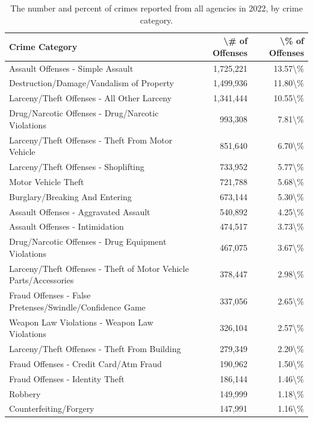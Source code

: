 \documentclass[
  12pt,
  openany]{book}
\begin{document}
\begin{longtable}[t]{lrr}
\caption{\label{tab:offenseCrimeCategories}The number and percent of crimes reported from all agencies in 2022, by crime category.}\\
\toprule
Crime Category & \textbackslash{}\# of Offenses & \textbackslash{}\% of Offenses\\
\midrule
Assault Offenses - Simple Assault & 1,725,221 & 13.57\textbackslash{}\%\\
Destruction/Damage/Vandalism of Property & 1,499,936 & 11.80\textbackslash{}\%\\
Larceny/Theft Offenses - All Other Larceny & 1,341,444 & 10.55\textbackslash{}\%\\
Drug/Narcotic Offenses - Drug/Narcotic Violations & 993,308 & 7.81\textbackslash{}\%\\
Larceny/Theft Offenses - Theft From Motor Vehicle & 851,640 & 6.70\textbackslash{}\%\\
\addlinespace
Larceny/Theft Offenses - Shoplifting & 733,952 & 5.77\textbackslash{}\%\\
Motor Vehicle Theft & 721,788 & 5.68\textbackslash{}\%\\
Burglary/Breaking And Entering & 673,144 & 5.30\textbackslash{}\%\\
Assault Offenses - Aggravated Assault & 540,892 & 4.25\textbackslash{}\%\\
Assault Offenses - Intimidation & 474,517 & 3.73\textbackslash{}\%\\
\addlinespace
Drug/Narcotic Offenses - Drug Equipment Violations & 467,075 & 3.67\textbackslash{}\%\\
Larceny/Theft Offenses - Theft of Motor Vehicle Parts/Accessories & 378,447 & 2.98\textbackslash{}\%\\
Fraud Offenses - False Pretenses/Swindle/Confidence Game & 337,056 & 2.65\textbackslash{}\%\\
Weapon Law Violations - Weapon Law Violations & 326,104 & 2.57\textbackslash{}\%\\
Larceny/Theft Offenses - Theft From Building & 279,349 & 2.20\textbackslash{}\%\\
\addlinespace
Fraud Offenses - Credit Card/Atm Fraud & 190,962 & 1.50\textbackslash{}\%\\
Fraud Offenses - Identity Theft & 186,144 & 1.46\textbackslash{}\%\\
Robbery & 149,999 & 1.18\textbackslash{}\%\\
Counterfeiting/Forgery & 147,991 & 1.16\textbackslash{}\%\\

\end{longtable}
\end{document}
